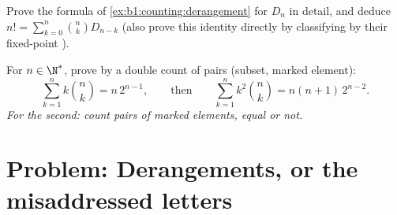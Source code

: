 \begin{exercise}[$\star\star\star$]\label{exo:b1:counting:11}
Prove the formula of \cref{ex:b1:counting:derangement} for $D_n$ in
detail, and deduce $n! = \sum_{k=0}^{n} \binom{n}{k} D_{n-k}$ (also
prove this identity directly by classifying  by their
fixed-point ).
\end{exercise}

\begin{exercise}[$\star\star\star$]\label{exo:b1:counting:12}
For $n \in \N^*$, prove by a double count of pairs (subset, marked
element):
\[
\sum_{k=1}^{n} k \binom{n}{k} = n\, 2^{n-1},
\qquad\text{then}\qquad
\sum_{k=1}^{n} k^2 \binom{n}{k} = n(n+1)\, 2^{n-2} .
\]
\emph{For the second: count pairs of marked elements, equal or not.}
\end{exercise}

\section{Problem: Derangements, or the misaddressed letters}

